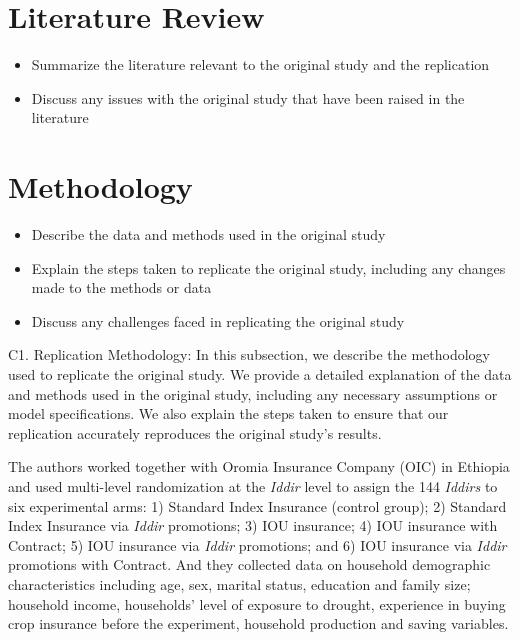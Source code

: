 \documentclass[AER]{AEA}
\begin{document}
\section{Literature Review}

\begin{itemize}

\item Summarize the literature relevant to the original study and the replication

\item Discuss any issues with the original study that have been raised in the literature

\end{itemize}

\section{Methodology}

\begin{itemize}

\item Describe the data and methods used in the original study

\item Explain the steps taken to replicate the original study, including any changes made to the methods or data

\item Discuss any challenges faced in replicating the original study

\end{itemize}

C1. Replication Methodology: In this subsection, we describe the
methodology used to replicate the original study. We provide a detailed
explanation of the data and methods used in the original study,
including any necessary assumptions or model specifications. We also
explain the steps taken to ensure that our replication accurately
reproduces the original study's results.

The authors worked together with Oromia Insurance Company (OIC) in
Ethiopia and used multi-level randomization at the \textit{Iddir} level
to assign the 144 \textit{Iddirs} to six experimental arms: 1) Standard
Index Insurance (control group); 2) Standard Index Insurance via
\textit{Iddir} promotions; 3) IOU insurance; 4) IOU insurance with
Contract; 5) IOU insurance via \textit{Iddir} promotions; and 6) IOU
insurance via \textit{Iddir} promotions with Contract. And they
collected data on household demographic characteristics including age,
sex, marital status, education and family size; household income,
households' level of exposure to drought, experience in buying crop
insurance before the experiment, household production and saving
variables.
\end{document}
